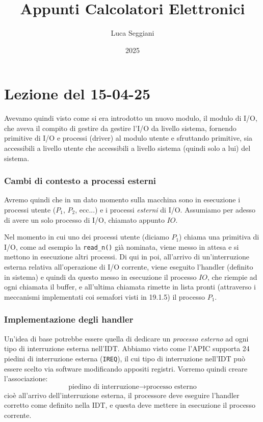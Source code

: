 \documentclass[a4paper,11pt]{article}
\title{Appunti Calcolatori Elettronici}
\author{Luca Seggiani}
\date{2025}
\begin{document}
\section{Lezione del 15-04-25}

\thispagestyle{empty}
\pagestyle{fancy}

Avevamo quindi visto come si era introdotto un nuovo modulo, il modulo di I/O, che aveva il compito di gestire da gestire l'I/O da livello sistema, fornendo primitive di I/O e processi (driver) al modulo utente e sfruttando primitive, sia accessibili a livello utente che accessibili a livello sistema (quindi solo a lui) del sistema.

\subsubsection{Cambi di contesto a processi esterni}
Avremo quindi che in un dato momento sulla macchina sono in esecuzione i processi utente ($P_1$, $P_2$, ecc...) e i processi \textit{esterni} di I/O.
Assumiamo per adesso di avere un solo processo di I/O, chiamato appunto $IO$.

Nel momento in cui uno dei processi utente (diciamo $P_1$) chiama una primitiva di I/O, come ad esempio la \lstinline|read_n()| già nominata, viene messo in attesa e si mettono in esecuzione altri processi.
Di qui in poi, all'arrivo di un'interruzione esterna relativa all'operazione di I/O corrente, viene eseguito l'handler (definito in sistema) e quindi da questo messo in esecuzione il processo $IO$, che riempie ad ogni chiamata il buffer, e all'ultima chiamata rimette in lista pronti (attraverso i meccanismi implementati coi semafori visti in 19.1.5) il processo $P_1$.

\subsubsection{Implementazione degli handler}
Un'idea di base potrebbe essere quella di dedicare un \textit{processo esterno} ad ogni tipo di interruzione esterna nell'IDT.
Abbiamo visto come l'APIC supporta 24 piedini di interruzione esterna (\lstinline|IREQ|), il cui tipo di interruzione nell'IDT può essere scelto via software modificando appositi registri.
Vorremo quindi creare l'associazione:
$$
\text{piedino di interruzione} \rightarrow \text{processo esterno}
$$
cioè all'arrivo dell'interruzione esterna, il processore deve eseguire l'handler corretto come definito nella IDT, e questa deve mettere in esecuzione il processo corrente.
\end{document}
